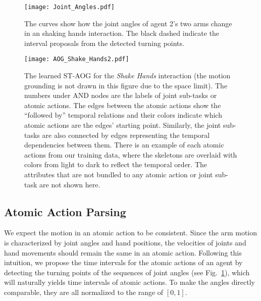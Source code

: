 \documentclass[letterpaper, 10 pt, conference]{ieeeconf}  %
\begin{document}
\begin{figure}[t!]
    \centering
    \texttt{[image: Joint\_Angles.pdf]}
    \vspace{-5pt}
    \caption{The curves show how the joint angles of agent 2's two arms change in an shaking hands interaction. The black dashed indicate the interval proposals from the detected turning points.}
    \vspace{-5pt}
    \label{fig:atomicparsing}
\end{figure}

\begin{figure*}[t!]
    \centering
    \texttt{[image: AOG\_Shake\_Hands2.pdf]}
    \vspace{-10pt}
    \caption{The learned ST-AOG for the \textit{Shake Hands} interaction (the motion grounding is not drawn in this figure due to the space limit). The numbers under AND nodes are the labels of joint sub-tasks or atomic actions. The edges between the atomic actions show the ``followed by'' temporal relations and their colors indicate which atomic actions are the edges' starting point. Similarly, the joint sub-tasks are also connected by edges representing the temporal dependencies between them. There is an example of each atomic actions from our training data, where the skeletons are overlaid with colors from light to dark to reflect the temporal order. The attributes that are not bundled to any atomic action or joint sub-task are not shown here.}
    \vspace{-5pt}
    \label{fig:AOG_Shake_Hands}
\end{figure*}





\subsection{Atomic Action Parsing}

We expect the motion in an atomic action to be consistent. Since the arm motion is characterized by joint angles and hand positions, the velocities of joints and hand movements should remain the same in an atomic action. Following this intuition, we propose the time intervals for the atomic actions of an agent by detecting the turning points of the sequences of joint angles (see Fig.~\ref{fig:atomicparsing}), which will naturally yields time intervals of atomic actions. To make the angles directly comparable, they are all normalized to the range of $[0, 1]$. 
\end{document}
